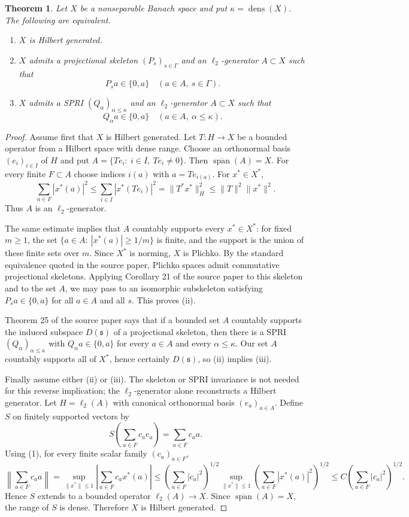 \documentclass[11pt]{article}
\newtheorem{theorem}{Theorem}
\newcommand{\dens}{\operatorname{dens}}
\newcommand{\spanop}{\operatorname{span}}
\begin{document}
\begin{theorem}
Let $X$ be a nonseparable Banach space and put $\kappa=\dens(X)$. The following
are equivalent.
\begin{enumerate}[label=(\roman*)]
\item $X$ is Hilbert generated.
\item $X$ admits a projectional skeleton $(P_s)_{s\in\Gamma}$ and an
  $\ell_2$-generator $A\subset X$ such that
  \[
    P_s a\in\{0,a\}\quad (a\in A,\ s\in\Gamma).
  \]
\item $X$ admits a SPRI $(Q_\alpha)_{\alpha\leq\kappa}$ and an
  $\ell_2$-generator $A\subset X$ such that
  \[
    Q_\alpha a\in\{0,a\}\quad (a\in A,\ \alpha\leq\kappa).
  \]
\end{enumerate}
\end{theorem}

\begin{proof}
Assume first that $X$ is Hilbert generated. Let $T:H\to X$ be a bounded operator
from a Hilbert space with dense range. Choose an orthonormal basis
$(e_i)_{i\in I}$ of $H$ and put $A=\{T e_i:\ i\in I,\ T e_i\ne 0\}$.
Then $\overline{\spanop}(A)=X$. For every finite $F\subset A$ choose indices
$i(a)$ with $a=T e_{i(a)}$. For $x^*\in X^*$,
\[
  \sum_{a\in F}|x^*(a)|^2
  \leq \sum_{i\in I}|x^*(T e_i)|^2
  = \|T^*x^*\|_H^2
  \leq \|T\|^2\|x^*\|^2.
\]
Thus $A$ is an $\ell_2$-generator.

The same estimate implies that $A$ countably supports every $x^*\in X^*$:
for fixed $m\geq1$, the set $\{a\in A:\ |x^*(a)|\geq 1/m\}$ is finite, and
the support is the union of these finite sets over $m$. Since $X^*$ is norming,
$X$ is Plichko. By the standard equivalence quoted in the source paper,
Plichko spaces admit commutative projectional skeletons. Applying Corollary 21
of the source paper to this skeleton and to the set $A$, we may pass to an
isomorphic subskeleton satisfying $P_s a\in\{0,a\}$ for all $a\in A$ and all
$s$. This proves (ii).

Theorem 25 of the source paper says that if a bounded set $A$ countably
supports the induced subspace $D(\mathfrak s)$ of a projectional skeleton, then
there is a SPRI $(Q_\alpha)_{\alpha\leq\kappa}$ with
$Q_\alpha a\in\{0,a\}$ for every $a\in A$ and every $\alpha\leq\kappa$.
Our set $A$ countably supports all of $X^*$, hence certainly $D(\mathfrak s)$,
so (ii) implies (iii).

Finally assume either (ii) or (iii). The skeleton or SPRI invariance is not
needed for this reverse implication; the $\ell_2$-generator alone reconstructs
a Hilbert generator. Let $H=\ell_2(A)$ with canonical orthonormal basis
$(e_a)_{a\in A}$. Define $S$ on finitely supported vectors by
\[
  S\left(\sum_{a\in F} c_a e_a\right)=\sum_{a\in F} c_a a.
\]
Using (1), for every finite scalar family $(c_a)_{a\in F}$,
\[
 \left\|\sum_{a\in F} c_a a\right\|
 = \sup_{\|x^*\|\leq1}\left|\sum_{a\in F} c_a x^*(a)\right|
 \leq \left(\sum_{a\in F}|c_a|^2\right)^{1/2}
      \sup_{\|x^*\|\leq1}\left(\sum_{a\in F}|x^*(a)|^2\right)^{1/2}
 \leq C\left(\sum_{a\in F}|c_a|^2\right)^{1/2}.
\]
Hence $S$ extends to a bounded operator $\ell_2(A)\to X$. Since
$\overline{\spanop}(A)=X$, the range of $S$ is dense. Therefore $X$ is Hilbert
generated.
\end{proof}
\end{document}
